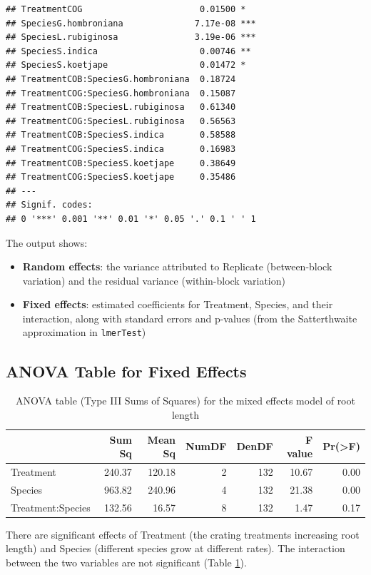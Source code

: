 \documentclass[
]{book}
\providecommand{\tightlist}{%
  \setlength{\itemsep}{0pt}\setlength{\parskip}{0pt}}
\begin{document}
\begin{verbatim}
## TreatmentCOG                       0.01500 *  
## SpeciesG.hombroniana              7.17e-08 ***
## SpeciesL.rubiginosa               3.19e-06 ***
## SpeciesS.indica                    0.00746 ** 
## SpeciesS.koetjape                  0.01472 *  
## TreatmentCOB:SpeciesG.hombroniana  0.18724    
## TreatmentCOG:SpeciesG.hombroniana  0.15087    
## TreatmentCOB:SpeciesL.rubiginosa   0.61340    
## TreatmentCOG:SpeciesL.rubiginosa   0.56563    
## TreatmentCOB:SpeciesS.indica       0.58588    
## TreatmentCOG:SpeciesS.indica       0.16983    
## TreatmentCOB:SpeciesS.koetjape     0.38649    
## TreatmentCOG:SpeciesS.koetjape     0.35486    
## ---
## Signif. codes:  
## 0 '***' 0.001 '**' 0.01 '*' 0.05 '.' 0.1 ' ' 1
\end{verbatim}

The output shows:

\begin{itemize}
\tightlist
\item
  \textbf{Random effects}: the variance attributed to Replicate (between-block variation) and the residual variance (within-block variation)
\item
  \textbf{Fixed effects}: estimated coefficients for Treatment, Species, and their interaction, along with standard errors and p-values (from the Satterthwaite approximation in \texttt{lmerTest})
\end{itemize}

\subsection{ANOVA Table for Fixed Effects}\label{anova-table-for-fixed-effects}

\begin{table}
\centering
\caption{\label{tab:anova-table-mixed}ANOVA table (Type III Sums of Squares) for the mixed effects model of root length}
\centering
\begin{tabular}[t]{l|r|r|r|r|r|r}
\hline
  & Sum Sq & Mean Sq & NumDF & DenDF & F value & Pr(>F)\\
\hline
Treatment & 240.37 & 120.18 & 2 & 132 & 10.67 & 0.00\\
\hline
Species & 963.82 & 240.96 & 4 & 132 & 21.38 & 0.00\\
\hline
Treatment:Species & 132.56 & 16.57 & 8 & 132 & 1.47 & 0.17\\
\hline
\end{tabular}
\end{table}

There are significant effects of Treatment (the crating treatments increasing root length) and Species (different species grow at different rates). The interaction between the two variables are not significant (Table \ref{tab:anova-table-mixed}).
\end{document}
